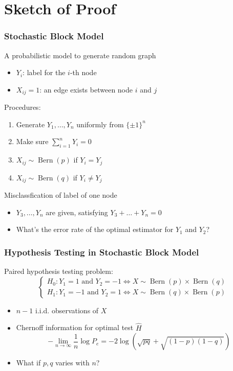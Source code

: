 \documentclass{beamer}
\DeclareMathOperator{\Bern}{Bern}
\begin{document}
\section{Sketch of Proof}
\begin{frame}
\frametitle{
Stochastic Block Model} A probabilistic model to generate random graph
\begin{itemize}
\item $Y_i$: label for the $i$-th node
\item $X_{ij}=1$: an edge exists between node $i$ and $j$
\end{itemize}
Procedures:
\begin{enumerate}
\item Generate $Y_1, \dots, Y_n$ uniformly from $\{\pm 1\}^n$
\item Make sure $\sum_{i=1}^n Y_i = 0$
\item $X_{ij} \sim \Bern(p) $ if $Y_i=Y_j$
\item $X_{ij} \sim \Bern(q) $ if $Y_i \neq Y_j$
\end{enumerate}
Misclassfication of label of one node
\begin{itemize}
\item $Y_3, \dots, Y_n$ are given, satisfying $Y_3 + \dots + Y_n  = 0$
\item What's the error rate of the optimal estimator for $Y_1$ and $Y_2$?
\end{itemize}
\end{frame}
\begin{frame}
\frametitle{
Hypothesis Testing in Stochastic Block Model} 
Paired hypothesis testing problem:
\begin{equation*}
\begin{cases}
H_0: Y_1 = 1 \textrm{ and } Y_2 = -1 \iff X \sim \Bern(p) \times \Bern(q)\\
H_1: Y_1 = -1 \textrm{ and } Y_2 = 1 \iff X \sim \Bern(q) \times \Bern(p)
\end{cases}
\end{equation*}
\begin{itemize}
\item $n-1$ i.i.d.  observations of $X$
\item Chernoff information for optimal test $\widehat{H}$
\begin{equation*}
-\lim_{n\to\infty} \frac{1}{n}\log P_e = -2 \log (\sqrt{pq}+\sqrt{(1-p)(1-q)})
\end{equation*}
\item What if $p,q$ varies with $n$?
\end{itemize}
\end{frame}
\end{document}
